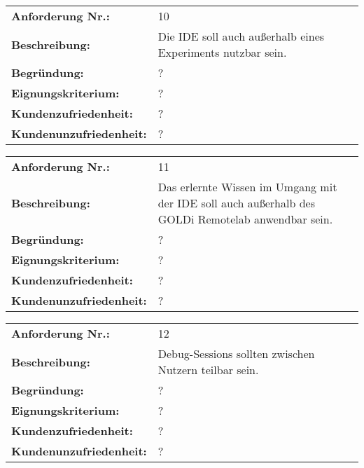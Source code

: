 \begin{tabularx}{\textwidth}{|lX|}
    \hline
    \textbf{Anforderung Nr.:}     & 10                                                          \\
    \textbf{Beschreibung:}        & Die IDE soll auch außerhalb eines Experiments nutzbar sein. \\
    \textbf{Begründung:}          & ?                                                           \\
    \textbf{Eignungskriterium:}   & ?                                                           \\
    \textbf{Kundenzufriedenheit:} & ?                                                           \\ \textbf{Kundenunzufriedenheit:} & ? \\
    \hline
\end{tabularx}

\begin{tabularx}{\textwidth}{|lX|}
    \hline
    \textbf{Anforderung Nr.:}     & 11                                                                                                \\
    \textbf{Beschreibung:}        & Das erlernte Wissen im Umgang mit der IDE soll auch außerhalb des GOLDi Remotelab anwendbar sein. \\
    \textbf{Begründung:}          & ?                                                                                                 \\
    \textbf{Eignungskriterium:}   & ?                                                                                                 \\
    \textbf{Kundenzufriedenheit:} & ?                                                                                                 \\ \textbf{Kundenunzufriedenheit:} & ? \\
    \hline
\end{tabularx}

\begin{tabularx}{\textwidth}{|lX|}
    \hline
    \textbf{Anforderung Nr.:}     & 12                                                    \\
    \textbf{Beschreibung:}        & Debug-Sessions sollten zwischen Nutzern teilbar sein. \\
    \textbf{Begründung:}          & ?                                                     \\
    \textbf{Eignungskriterium:}   & ?                                                     \\
    \textbf{Kundenzufriedenheit:} & ?                                                     \\ \textbf{Kundenunzufriedenheit:} & ? \\
    \hline
\end{tabularx}

